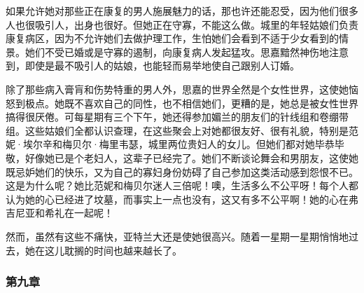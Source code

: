 \par 如果允许她对那些正在康复的男人施展魅力的话，那也许还能忍受，因为他们很多人也很吸引人，出身也很好。但她正在守寡，不能这么做。城里的年轻姑娘们负责康复病区，因为不允许她们去做护理工作，生怕她们会看到不适于少女看到的情景。她们不受已婚或是守寡的遏制，向康复病人发起猛攻。思嘉黯然神伤地注意到，即使是最不吸引人的姑娘，也能轻而易举地使自己跟别人订婚。
\par 除了那些病入膏肓和伤势特重的男人外，思嘉的世界全然是个女性世界，这使她恼怒到极点。她既不喜欢自己的同性，也不相信她们，更糟的是，她总是被女性世界搞得很厌倦。可每星期有三个下午，她还得参加媚兰的朋友们的针线组和卷绷带组。这些姑娘们全都认识查理，在这些聚会上对她都很友好、很有礼貌，特别是范妮·埃尔辛和梅贝尔·梅里韦瑟，城里两位贵妇人的女儿。但她们都对她毕恭毕敬，好像她已是个老妇人，这辈子已经完了。她们不断谈论舞会和男朋友，这使她既忌妒她们的快乐，又为自己的寡妇身份妨碍了自己参加这类活动感到怨恨不已。这是为什么呢？她比范妮和梅贝尔迷人三倍呢！噢，生活多么不公平呀！每个人都认为她的心已经进了坟墓，而事实上一点也没有，这又有多不公平啊！她的心在弗吉尼亚和希礼在一起呢！
\par 然而，虽然有这些不痛快，亚特兰大还是使她很高兴。随着一星期一星期悄悄地过去，她在这儿耽搁的时间也越来越长了。

\subsubsection{第九章}

